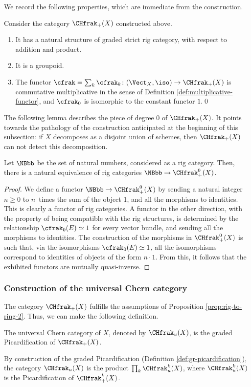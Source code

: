 We record the following properties, which are immediate from the construction.

\begin{lemma}\label{lemma:cfrak-CHplus}
Consider the category $\CHfrak_{+}(X)$ constructed above.

\begin{enumerate}
\item It has a natural structure of graded strict rig category, with respect to addition and product.
\item It is a groupoid.
\item The functor $\cfrak=\sum_{k}\cfrak_{k}\colon (\Vect_{X},\iso)\to\CHfrak_{+}(X)$ is commutative multiplicative in the sense of Definition \ref{def:multiplicative-functor}, and $\cfrak_{0}$ is isomorphic to the constant functor $1$.\qed
\end{enumerate}
\end{lemma}

The following lemma describes the piece of degree 0 of $\CHfrak_{+}(X)$. It points towards the pathology of the construction anticipated at the beginning of this subsection: if $X$ decomposes as a disjoint union of schemes, then $\CHfrak_{+}(X)$ can not detect this decomposition.

\begin{lemma}\label{lemma:CHplus0-N}
Let $\NBbb$ be the set of natural numbers, considered as a rig category. Then, there is a natural equivalence of rig categories $\NBbb\to\CHfrak_{+}^{0}(X)$.
\end{lemma}
\begin{proof}
We define a functor $\NBbb\to\CHfrak_{+}^{0}(X)$ by sending a natural integer $n\geq 0$ to $n$~times the sum of the object 1, and all the morphisms to identities. This is clearly a functor of rig categories. A functor in the other direction, with the property of being compatible with the rig structures, is determined by the relationship $\cfrak_{0}(E)\simeq 1$ for every vector bundle, and sending all the morphisms to identities. The construction of the morphisms in $\CHfrak^{0}_{+}(X)$ is such that, via the isomorphisms $\cfrak_{0}(E)\simeq 1$, all the isomorphisms correspond to identities of objects of the form $n\cdot 1$. From this, it follows that the exhibited functors are mutually quasi-inverse.
\end{proof}

\subsubsection{Construction of the universal Chern category} The category $\CHfrak_{+}(X)$ fulfills the assumptions of Proposition \ref{prop:rig-to-ring-2}. Thus, we can make the following definition.
\begin{definition}
The universal Chern category of $X$, denoted by $\CHfrak_{u}(X)$, is the graded Picardification of $\CHfrak_{+}(X)$.
\end{definition}
By construction of the graded Picardification (\cf Definition \ref{def:gr-picardification}), the category $\CHfrak_{u}(X)$ is the product $\prod_{k}\CHfrak_{u}^{k}(X)$, where $\CHfrak_{u}^{k}(X)$ is the Picardification of $\CHfrak_{+}^{k}(X)$.

